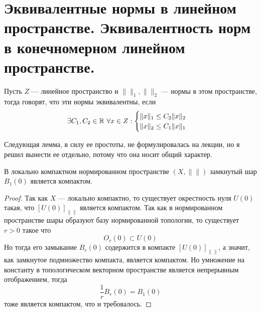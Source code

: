 \newpage
\section{Эквивалентные нормы в линейном пространстве. Эквивалентность норм в конечномерном линейном пространстве.}

\begin{definition}
	Пусть $Z$ --- линейное пространство и $\|\|_1, \|\|_2$ --- нормы в этом пространстве, тогда говорят, что эти нормы эквивалентны, если
	$$
	\exists C_1, C_2 \in \mathbb{R} \ \forall x \in Z:	\begin{cases}
		\|x\|_1 \leq C_2 \|x\|_2 \\
		\|x\|_2 \leq C_1 \|x\|_1
	\end{cases}
	$$
\end{definition}

Следующая лемма, в силу ее простоты, не формулировалась на лекции, но я решил вынести ее отдельно, потому что она носит общий характер.
\begin{lemma}
	В локально компактном нормированном пространстве $(X, \|\|)$ замкнутый шар $B_1(0)$ является компактом. 
\end{lemma}
\begin{proof}
	Так как $X$ --- локально компактно, то существует окрестность нуля $	U(0)$ такая, что $[U(0)]_{\|\|}$ является компактом. Так как в нормированном пространстве шары образуют базу нормированной топологии, то существует $r>0$ такое что 
	$$
	O_r(0) \subset U(0)
	$$
	Но тогда его замыкание $B_r(0)$ содержится в компакте $[U(0)]_{\|\|}$, а значит, как замкнутое подмножество компакта, является компактом. Но умножение на константу в топологическом векторном пространстве является непрерывным отображением, тогда 
	$$
	\frac{1}{r} B_r(0) = B_1(0)
	$$ 
	тоже является компактом, что и требовалось.
	
\end{proof}

